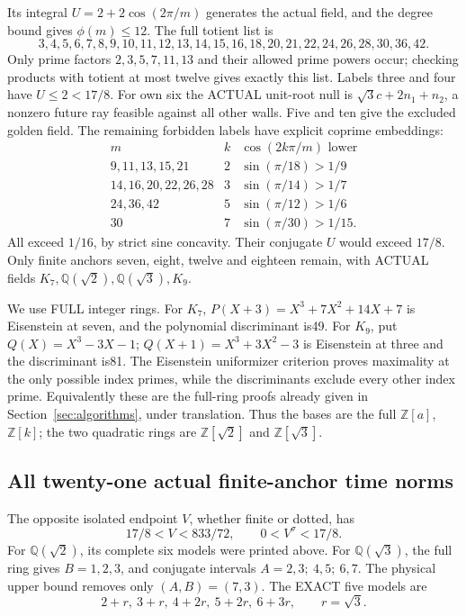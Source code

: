 Its integral \(U=2+2\cos(2\pi/m)\) generates the actual field,
and the degree bound gives \(\phi(m)\le12\).
The full totient list is
\[
 3,4,5,6,7,8,9,10,11,12,13,14,15,16,
 18,20,21,22,24,26,28,30,36,42 .
\]
Only prime factors \(2,3,5,7,11,13\) and their allowed prime
powers occur; checking products with totient at most twelve
gives exactly this list.
Labels three and four have \(U\le2<17/8\).
For own six the ACTUAL unit-root null is
\(\sqrt3c+2n_1+n_2\), a nonzero future ray feasible against
all other walls.
Five and ten give the excluded golden field.
The remaining forbidden labels have explicit coprime embeddings:
\[
\begin{array}{c|c|c}
m&k&\cos(2k\pi/m)\text{ lower}\\ \hline
9,11,13,15,21&2&\sin(\pi/18)>1/9\\
14,16,20,22,26,28&3&\sin(\pi/14)>1/7\\
24,36,42&5&\sin(\pi/12)>1/6\\
30&7&\sin(\pi/30)>1/15 .
\end{array}
\]
All exceed \(1/16\), by strict sine concavity.
Their conjugate \(U\) would exceed \(17/8\).
Only finite anchors seven, eight, twelve and eighteen remain,
with ACTUAL fields \(K_7,\mathbb Q(\sqrt2),\mathbb Q(\sqrt3),K_9\).

We use FULL integer rings.
For \(K_7\), \(P(X+3)=X^3+7X^2+14X+7\) is Eisenstein
at seven, and the polynomial discriminant is49.
For \(K_9\), put \(Q(X)=X^3-3X-1\);
\(Q(X+1)=X^3+3X^2-3\) is Eisenstein at three and the
discriminant is81.
The Eisenstein uniformizer criterion proves maximality at the
only possible index primes, while the discriminants exclude
every other index prime.
Equivalently these are the full-ring proofs already given in
Section~\ref{sec:algorithms}, under translation.
Thus the bases are the full \(\mathbb Z[a]\), \(\mathbb Z[k]\);
the two quadratic rings are \(\mathbb Z[\sqrt2]\) and
\(\mathbb Z[\sqrt3]\).

\subsection{All twenty-one actual finite-anchor time norms}
\label{app:arithA16times}

The opposite isolated endpoint \(V\), whether finite or dotted,
has
\[
                    17/8<V<833/72,\qquad0<V^\sigma<17/8 .
\]
For \(\mathbb Q(\sqrt2)\), its complete six models were printed
above.
For \(\mathbb Q(\sqrt3)\), the full ring gives
\(B=1,2,3\), and conjugate intervals
\(A=2,3;\ 4,5;\ 6,7\).
The physical upper bound removes only \((A,B)=(7,3)\).
The EXACT five models are
\[
                    2+r,\ 3+r,\ 4+2r,\ 5+2r,\ 6+3r,
                    \qquad r=\sqrt3.
\]

